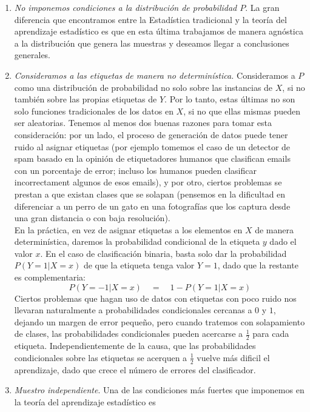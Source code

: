 \documentclass{article}
\begin{document}
\begin{enumerate}
    \item \textit{No imponemos condiciones a la distribución de probabilidad $P$}. La gran diferencia que encontramos entre la Estadística
    tradicional y la teoría del aprendizaje estadístico es que en esta última trabajamos de manera agnóstica a la distribución
    que genera las muestras y deseamos llegar a conclusiones generales.
    \item \textit{Consideramos a las etiquetas de manera no determinística.} Consideramos a $P$ como una distribución de probabilidad
    no solo sobre las instancias de $X$, si no también sobre las propias etiquetas de $Y$. Por lo tanto, estas últimas no son solo 
    funciones tradicionales de los datos en $X$, si no que ellas mismas pueden ser aleatorias. Tenemos al menos dos buenas razones
    para tomar esta consideración: por un lado, el proceso de generación de datos puede tener ruido al asignar etiquetas (por ejemplo
    tomemos el caso de un detector de spam basado en la opinión de etiquetadores humanos que clasifican emails con un porcentaje de error; incluso
    los humanos pueden clasificar incorrectament algunos de esos emails), y por otro, ciertos problemas se prestan a que existan
    clases que se solapan (pensemos en la dificultad en diferenciar a un perro de un gato en una fotografías que los captura desde
    una gran distancia o con baja resolución).\\
    En la práctica, en vez de asignar etiquetas a los elementos en $X$ de manera determinística, daremos la probabilidad condicional
    de la etiqueta $y$ dado el valor $x$. En el caso de clasificación binaria, basta solo dar la probabilidad $P(Y=1|X=x)$ de que la etiqueta
    tenga valor $Y=1$, dado que la restante es complementaria:
    $$
    P(Y=-1|X=x) \quad = \quad 1 - P(Y=1|X=x)
    $$
    Ciertos problemas que hagan uso de datos con etiquetas con poco ruido nos llevaran naturalmente a probabilidades condicionales cercanas
    a $0$ y $1$, dejando un margen de error pequeño, pero cuando tratemos con solapamiento de clases, las probabilidades condicionales
    pueden acercarse a $\frac{1}{2}$ para cada etiqueta. Independientemente de la causa, que las probabilidades condicionales sobre
    las etiquetas se acerquen a $\frac{1}{2}$ vuelve más dificil el aprendizaje, dado que crece el número de errores del clasificador.
    \item \textit{Muestro independiente}. Una de las condiciones más fuertes que imponemos en la teoría del aprendizaje estadístico es

\end{enumerate}
\end{document}
